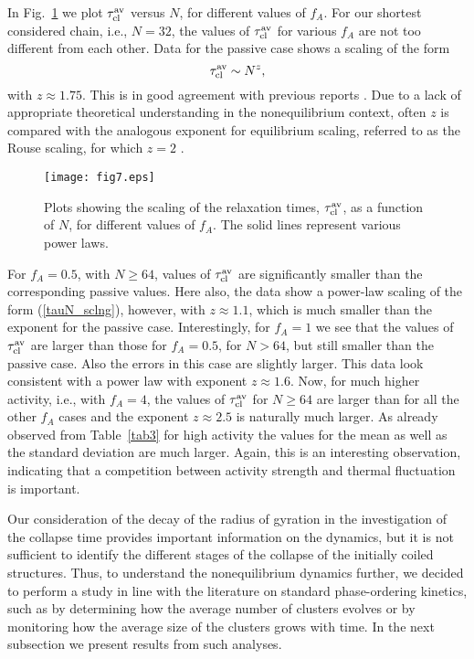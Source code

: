 \documentclass[aps,prx,reprint,showpacs,showkeys,noeprint,longbibliography]{revtex4-1} %
\begin{document}
\par 
In Fig.~\ref{tau_N0} we plot $\tau_{\rm{cl}}^{\rm{av}}$ versus $N$, for different values of $f_A$. For our shortest considered chain, i.e., $N=32$, the values of $\tau_{\rm{cl}}^{\rm{av}}$ for various $f_A$ are not too different from each other. Data for the passive case shows a scaling of the form 
\begin{equation}\label{tauN_sclng}
\tau_{\rm{cl}}^{\rm{av}} \sim N^{z},
\end{equation}
with $z \approx 1.75$.  This is in good agreement with previous reports \cite{majumder3, majumder4, klushin,  kikuchi}. Due to a lack of appropriate theoretical understanding in the nonequilibrium context, often $z$ is compared with the analogous exponent for equilibrium scaling, referred to as the Rouse scaling, for which $z=2$ \cite{rouse}.
\begin{figure}[b!]
	\centering
	\texttt{[image: fig7.eps]}
	\caption{\label{tau_N0} Plots showing the scaling of the relaxation times, $\tau_{\rm{cl}}^{\rm{av}}$, as a function of $N$, 
		for different values of $f_A$. The solid lines represent various power laws.}
\end{figure}
\par 
For $f_A=0.5$, with $N \ge 64$, values of $\tau_{\rm{cl}}^{\rm{av}}$ are significantly smaller than the corresponding passive values. Here also, the data show a power-law scaling of the form (\ref{tauN_sclng}), however, 
with $z \approx 1.1$, which is much smaller than the exponent for the passive case. Interestingly,
for $f_A=1$ we see that the values of $\tau_{\rm{cl}}^{\rm{av}}$ are larger than those for $f_A=0.5$, for $N > 64$, but still smaller than the passive case. Also the errors in this case are slightly larger. This data look consistent with a power law with exponent $z \approx 1.6$. Now, for much higher activity, i.e., with $f_A=4$, the values of $\tau_{\rm{cl}}^{\rm{av}}$ for $N \ge 64$ are larger than for all the other $f_A$ cases and the exponent $z \approx 2.5$ is naturally much larger. As already observed from Table~\ref{tab3} for high activity the values for the mean as well as the standard deviation are much larger. Again, this is an interesting observation, indicating that a competition between activity strength and thermal fluctuation is important.

\par
Our consideration of the decay of the radius of gyration in the investigation of the collapse time provides important information on the dynamics, but it is not sufficient to identify the different stages of the collapse of the initially coiled structures. 
Thus, to understand the nonequilibrium dynamics further, we decided to perform a study in line with 
the literature on standard phase-ordering kinetics, such as by determining how the 
average number of clusters evolves or by monitoring how the average size of the clusters grows with time. In the next subsection we present results from such analyses.
\end{document}
